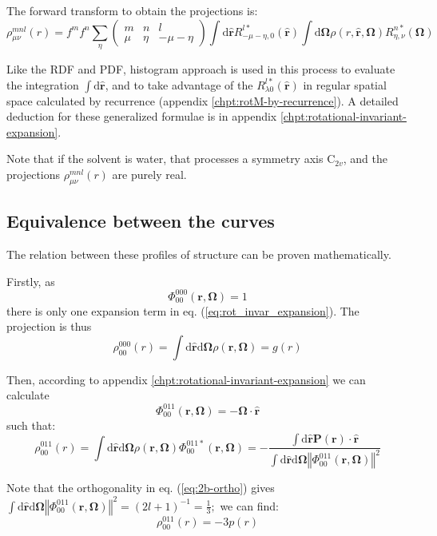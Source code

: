 The forward transform to obtain the projections is:
\begin{equation}
\rho_{\mu\nu}^{mnl}(r)=f^{m}f^{n}\sum_{\eta}\left(\begin{array}{ccc}
m & n & l\\
\mu & \eta & -\mu-\eta
\end{array}\right)\int\mathrm{d}\hat{\mathbf{r}}R_{-\mu-\eta,0}^{l*}(\mathbf{\hat{r}})\int\mathrm{d}\mathbf{\Omega}\rho(r,\hat{\mathbf{r}},\mathbf{\Omega})R_{\eta,\nu}^{n*}(\mathbf{\Omega})
\end{equation}

Like the \acs{RDF} and \acs{PDF}, histogram approach is used in
this process to evaluate the integration $\int\mathrm{d}\hat{\mathbf{r}}$,
and to take advantage of the $R_{\lambda0}^{l*}(\mathbf{\hat{r}})$ in
regular spatial space calculated by recurrence (appendix \ref{chpt:rotM-by-recurrence}).
A detailed deduction for these generalized formulae is in appendix
\ref{chpt:rotational-invariant-expansion}.

Note that if the solvent is water, that processes a symmetry axis
$\mathrm{C}_{2v}$, and the projections $\rho_{\mu\nu}^{mnl}(r)$ are
purely real.

\subsection{Equivalence between the curves}

The relation between these profiles of structure can be proven mathematically.

Firstly, as
\begin{equation}
\Phi_{00}^{000}(\mathbf{r},\mathbf{\Omega})=1
\end{equation}
there is only one expansion term in eq. (\ref{eq:rot_invar_expansion}).
The projection is thus
\begin{equation}
\rho_{00}^{000}(r)=\int\mathrm{d}\hat{\mathbf{r}}\mathrm{d}\mathbf{\Omega}\rho(\mathbf{r},\mathbf{\Omega})=g(r)
\end{equation}

Then, according to appendix \ref{chpt:rotational-invariant-expansion}
we can calculate
\begin{equation}
\Phi_{00}^{011}(\mathbf{r},\mathbf{\Omega})=-\mathbf{\Omega}\cdot\hat{\mathbf{r}}
\end{equation}
such that:
\begin{equation}
\rho_{00}^{011}(r)=\int\mathrm{d}\hat{\mathbf{r}}\mathrm{d}\mathbf{\Omega}\rho(\mathbf{r},\mathbf{\Omega})\Phi_{00}^{011*}(\mathbf{r},\mathbf{\Omega})=-\dfrac{\int\mathrm{d}\hat{\mathbf{r}}\mathbf{P}(\mathbf{r})\cdot\hat{\mathbf{r}}}{\int\mathrm{d}\hat{\mathbf{r}}\mathrm{d}\mathbf{\Omega}\left\Vert \Phi_{00}^{011}(\mathbf{r},\mathbf{\Omega})\right\Vert ^{2}}
\end{equation}

Note that the orthogonality in eq. (\ref{eq:2b-ortho}) gives $\int\mathrm{d}\hat{\mathbf{r}}\mathrm{d}\mathbf{\Omega}\left\Vert \Phi_{00}^{011}(\mathbf{r},\mathbf{\Omega})\right\Vert ^{2}=\left(2l+1\right)^{-1}=\frac{1}{3};$
we can find:
\begin{equation}
\rho_{00}^{011}(r)=-3p(r)
\end{equation}

